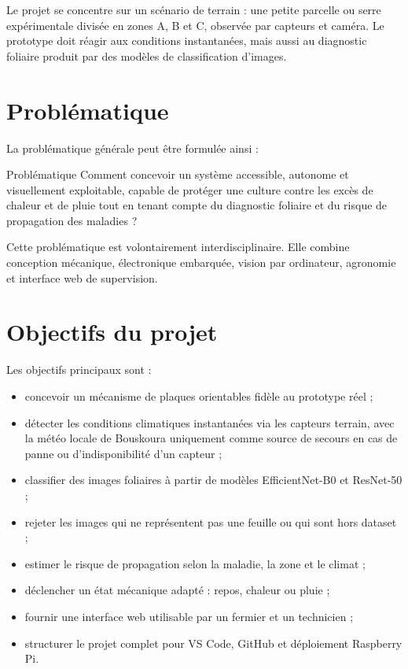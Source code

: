 ﻿\documentclass[11pt,a4paper,openany]{report}
\begin{document}
Le projet se concentre sur un scénario de terrain : une petite parcelle ou serre expérimentale divisée en zones A, B et C, observée par capteurs et caméra. Le prototype doit réagir aux conditions instantanées, mais aussi au diagnostic foliaire produit par des modèles de classification d'images.

\section{Problématique}
La problématique générale peut être formulée ainsi :

\begin{importantbox}{Problématique}
Comment concevoir un système accessible, autonome et visuellement exploitable, capable de protéger une culture contre les excès de chaleur et de pluie tout en tenant compte du diagnostic foliaire et du risque de propagation des maladies ?
\end{importantbox}

Cette problématique est volontairement interdisciplinaire. Elle combine conception mécanique, électronique embarquée, vision par ordinateur, agronomie et interface web de supervision.

\section{Objectifs du projet}
Les objectifs principaux sont :
\begin{itemize}
  \item concevoir un mécanisme de plaques orientables fidèle au prototype réel ;
  \item détecter les conditions climatiques instantanées via les capteurs terrain, avec la météo locale de Bouskoura uniquement comme source de secours en cas de panne ou d'indisponibilité d'un capteur ;
  \item classifier des images foliaires à partir de modèles EfficientNet-B0 et ResNet-50 ;
  \item rejeter les images qui ne représentent pas une feuille ou qui sont hors dataset ;
  \item estimer le risque de propagation selon la maladie, la zone et le climat ;
  \item déclencher un état mécanique adapté : repos, chaleur ou pluie ;
  \item fournir une interface web utilisable par un fermier et un technicien ;
  \item structurer le projet complet pour VS Code, GitHub et déploiement Raspberry Pi.
\end{itemize}
\end{document}
